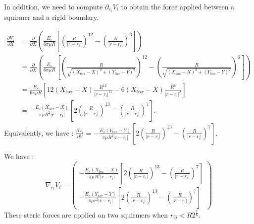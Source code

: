 \documentclass{article}
\begin{document}
\vspace{0,5cm}

In addition, we need to compute $\partial_{r_i} V_i$ to obtain the force applied between a squirmer and a rigid boundary.

\begin{align*}
    \frac{\partial V_i}{\partial X} &= \frac{\partial}{\partial X} \left( \frac{E_s}{6\pi\mu R} \left[ \left( \frac{R}{\lvert r - r_i \rvert} \right)^{12} - \left( \frac{R}{\lvert r - r_i \rvert} \right) ^6 \right] \right) \\
    &= \frac{\partial}{\partial X} \left( \frac{E_s}{6\pi\mu R} \left[ \left( \frac{R}{\sqrt{( X_{box}-X)^2 + (Y_{box}-Y)^2}} \right)^{12} - \left( \frac{R}{\sqrt{( X_{box}-X)^2 + (Y_{box}-Y)^2}} \right) ^6 \right] \right) \\
    &= \frac{E_s}{6\pi\mu R}\left[ 12(X_{box}-X)\frac{R^{12}}{\lvert r - r_i\rvert^{14}} - 6(X_{box}-X)\frac{R^6}{\lvert r-r_i\rvert^8} \right] \\
    &= -\frac{E_s (X_{box}-X)}{\pi\mu R^2 \lvert r - r_i \rvert } \left[ 2 \left( \frac{R}{\lvert r-r_i\rvert} \right)^{13} - \left( \frac{R}{\lvert r-r_i\rvert}\right)^7 \right].
\end{align*}
Equivalently, we have : $\frac{\partial V_i}{\partial Y}$ = $ - \frac{E_s (Y_{box}-Y)}{\pi\mu R^2 \lvert r - r_i \rvert } \left[ 2 \left( \frac{R}{\lvert r-r_i\rvert} \right)^{13} - \left( \frac{R}{\lvert r-r_i\rvert}\right)^7 \right].$

We have : 
\begin{equation*}
    \boxed{\nabla_{r_i} V_i = \begin{pmatrix}
        - \frac{E_s (X_{box}-X)}{\pi\mu R^2 \lvert r - r_i \rvert } \left[ 2 \left( \frac{R}{\lvert r-r_i\rvert} \right)^{13} - \left( \frac{R}{\lvert r-r_i\rvert}\right)^7 \right] \\
        - \frac{E_s (Y_{box}-Y)}{\pi\mu r^2 \lvert r - r_i \rvert } \left[ 2 \left( \frac{R}{\lvert r-r_i\rvert} \right)^{13} - \left( \frac{R}{\lvert r-r_i\rvert}\right)^7 \right]
    \end{pmatrix}}
\end{equation*}
These steric forces are applied on two squirmers when $r_{ij} < R2^{\frac{7}{6}}$.
\end{document}
